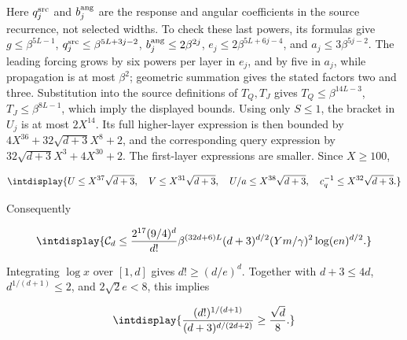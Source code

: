 
Here \(q_j^{\rm src}\) and \(b_j^{\rm ang}\) are the response and angular coefficients in the source recurrence, not selected widths. To check these last powers, its formulas give \(g\le\beta^{5L-1}\), \(q_j^{\rm src}\le\beta^{5L+3j-2}\), \(b_j^{\rm ang}\le2\beta^{2j}\), \(e_j\le2\beta^{5L+6j-4}\), and \(a_j\le3\beta^{5j-2}\). The leading forcing grows by six powers per layer in \(e_j\), and by five in \(a_j\), while propagation is at most \(\beta^2\); geometric summation gives the stated factors two and three. Substitution into the source definitions of \(T_Q,\allowbreak T_J\) gives \(T_Q\le\beta^{14L-3}\), \(T_J\le\beta^{8L-1}\), which imply the displayed bounds. Using only \(S\le1\), the bracket in \(U_j\) is at most \(2X^{14}\). Its full higher-layer expression is then bounded by \(4X^{36}+32\sqrt{d+3}X^8+2\), and the corresponding query expression by \(32\sqrt{d+3}X^3+4X^{30}+2\). The first-layer expressions are smaller. Since \(X\ge100\),


\begingroup\renewcommand{\theHequation}{intdisplay.637}
\begin{equation*}
\intdisplay{
U\le X^{37}\sqrt{d+3},\quad V\le X^{31}\sqrt{d+3},\quad
U/a\le X^{38}\sqrt{d+3},\quad c_q^{-1}\le X^{32}\sqrt{d+3}.
}
\end{equation*}
\endgroup


Consequently


\begingroup\renewcommand{\theHequation}{intdisplay.638}
\begin{equation}
\intdisplay{
\mathcal C_d\le\frac{2^{17}(9/4)^d}{d!}
 \beta^{(32d+6)L}(d+3)^{d/2}
                (Ym/\gamma)^2\log(en)^{d/2}.
}
\label{int:eq-0271-harmonic-full-range-rank-envelope}
\end{equation}
\endgroup


Integrating \(\log x\) over \([1,\allowbreak d]\) gives \(d!\ge(d/e)^d\). Together with \(d+3\le4d\), \(d^{1/(d+1)}\le2\), and \(2\sqrt2e<8\), this implies


\begingroup\renewcommand{\theHequation}{intdisplay.639}
\begin{equation*}
\intdisplay{
\frac{(d!)^{1/(d+1)}}{(d+3)^{d/(2d+2)}}\ge\frac{\sqrt d}{8}.
}
\end{equation*}
\endgroup

